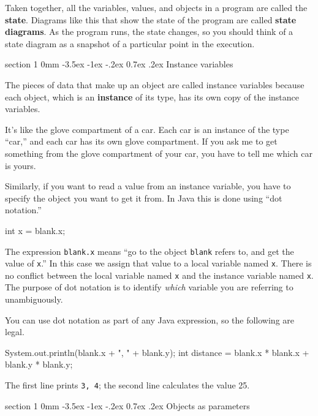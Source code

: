 \documentclass{book}
\makeatletter
\renewcommand{\section}{\@startsection 
    {section} {1} {0mm}%
    {-3.5ex \@plus -1ex \@minus -.2ex}%
    {0.7ex \@plus.2ex}%
    {\normalfont\Large\bfseries}}
\makeatother
\begin{document}
Taken together, all the variables, values, and objects in a
program are called the {\bf state}.  Diagrams like this that
show the state of the program are called {\bf state diagrams}.
As the program runs, the state changes, so you should think
of a state diagram as a snapshot of a particular point in the
execution.


\section{Instance variables}

The pieces of data that make up an object are called instance
variables because each object, which is an {\bf instance} of its
type, has its own copy of the instance variables.

It's like the glove compartment of a car.  Each car is an instance
of the type ``car,'' and each car has its own glove compartment.  If
you ask me to get something from the glove compartment of your car,
you have to tell me which car is yours.


Similarly, if you want to read a value from an instance variable, you
have to specify the object you want to get it from.  In Java this is
done using ``dot notation.''

\begin{verbatimtab}
    int x = blank.x;
\end{verbatimtab}
%
The expression {\tt blank.x} means ``go to the object {\tt blank}
refers to, and get the value of {\tt x}.''  In this case we assign
that value to a local variable named {\tt x}.  There is no
conflict between the local variable named {\tt x} and the instance
variable named {\tt x}.  The purpose of dot notation is to identify
{\em which} variable you are referring to unambiguously.

You can use dot notation as part of any Java expression, so the
following are legal.

\begin{verbatimtab}
    System.out.println(blank.x + ", " + blank.y);
    int distance = blank.x * blank.x + blank.y * blank.y;
\end{verbatimtab}
%
The first line prints {\tt 3, 4}; the second line calculates
the value 25.

\section{Objects as parameters}
\end{document}

